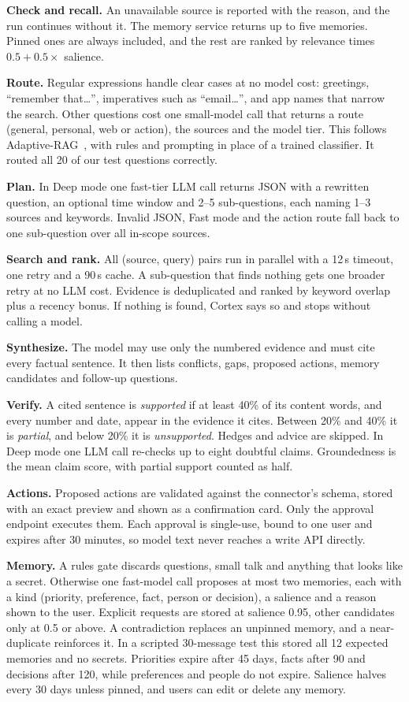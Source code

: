 \documentclass[conference]{IEEEtran}
\begin{document}
\textbf{Check and recall.} An unavailable source is reported with the reason, and the run continues without it. The memory service returns up to five memories. Pinned ones are always included, and the rest are ranked by relevance times $0.5 + 0.5 \times$ salience.

\textbf{Route.} Regular expressions handle clear cases at no model cost: greetings, ``remember that\ldots'', imperatives such as ``email\ldots'', and app names that narrow the search. Other questions cost one small-model call that returns a route (general, personal, web or action), the sources and the model tier. This follows Adaptive-RAG~\cite{jeong2024adaptiverag}, with rules and prompting in place of a trained classifier. It routed all 20 of our test questions correctly.

\textbf{Plan.} In Deep mode one fast-tier LLM call returns JSON with a rewritten question, an optional time window and 2--5 sub-questions, each naming 1--3 sources and keywords. Invalid JSON, Fast mode and the action route fall back to one sub-question over all in-scope sources.

\textbf{Search and rank.} All (source, query) pairs run in parallel with a 12\,s timeout, one retry and a 90\,s cache. A sub-question that finds nothing gets one broader retry at no LLM cost. Evidence is deduplicated and ranked by keyword overlap plus a recency bonus. If nothing is found, Cortex says so and stops without calling a model.

\textbf{Synthesize.} The model may use only the numbered evidence and must cite every factual sentence. It then lists conflicts, gaps, proposed actions, memory candidates and follow-up questions.

\textbf{Verify.} A cited sentence is \emph{supported} if at least 40\% of its content words, and every number and date, appear in the evidence it cites. Between 20\% and 40\% it is \emph{partial}, and below 20\% it is \emph{unsupported}. Hedges and advice are skipped. In Deep mode one LLM call re-checks up to eight doubtful claims. Groundedness is the mean claim score, with partial support counted as half.

\textbf{Actions.} Proposed actions are validated against the connector's schema, stored with an exact preview and shown as a confirmation card. Only the approval endpoint executes them. Each approval is single-use, bound to one user and expires after 30 minutes, so model text never reaches a write API directly.

\textbf{Memory.} A rules gate discards questions, small talk and anything that looks like a secret. Otherwise one fast-model call proposes at most two memories, each with a kind (priority, preference, fact, person or decision), a salience and a reason shown to the user. Explicit requests are stored at salience 0.95, other candidates only at 0.5 or above. A contradiction replaces an unpinned memory, and a near-duplicate reinforces it. In a scripted 30-message test this stored all 12 expected memories and no secrets. Priorities expire after 45 days, facts after 90 and decisions after 120, while preferences and people do not expire. Salience halves every 30 days unless pinned, and users can edit or delete any memory.
\end{document}
